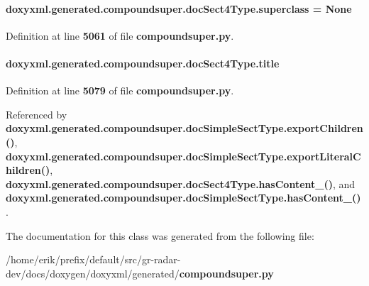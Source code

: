 \paragraph[{superclass}]{\setlength{\rightskip}{0pt plus 5cm}doxyxml.\+generated.\+compoundsuper.\+doc\+Sect4\+Type.\+superclass = None\hspace{0.3cm}{\ttfamily [static]}}\label{classdoxyxml_1_1generated_1_1compoundsuper_1_1docSect4Type_a57ed92327a1a883548cfbc0ec450e65a}


Definition at line {\bf 5061} of file {\bf compoundsuper.\+py}.

\paragraph[{title}]{\setlength{\rightskip}{0pt plus 5cm}doxyxml.\+generated.\+compoundsuper.\+doc\+Sect4\+Type.\+title}\label{classdoxyxml_1_1generated_1_1compoundsuper_1_1docSect4Type_a064fdbe755ac18d220ac820a468d0f31}


Definition at line {\bf 5079} of file {\bf compoundsuper.\+py}.



Referenced by {\bf doxyxml.\+generated.\+compoundsuper.\+doc\+Simple\+Sect\+Type.\+export\+Children()}, {\bf doxyxml.\+generated.\+compoundsuper.\+doc\+Simple\+Sect\+Type.\+export\+Literal\+Children()}, {\bf doxyxml.\+generated.\+compoundsuper.\+doc\+Sect4\+Type.\+has\+Content\+\_\+()}, and {\bf doxyxml.\+generated.\+compoundsuper.\+doc\+Simple\+Sect\+Type.\+has\+Content\+\_\+()}.



The documentation for this class was generated from the following file\+:\begin{DoxyCompactItemize}
\item 
/home/erik/prefix/default/src/gr-\/radar-\/dev/docs/doxygen/doxyxml/generated/{\bf compoundsuper.\+py}\end{DoxyCompactItemize}
